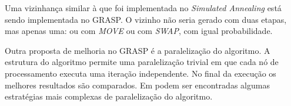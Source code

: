 \documentclass[11pt]{article}
\begin{document}
Uma vizinhança similar à que foi implementada no \textit{Simulated Annealing} está sendo implementada no GRASP. O vizinho não seria gerado com duas etapas, mas apenas uma: ou com \textit{MOVE} ou com \textit{SWAP}, com igual probabilidade.

Outra proposta de melhoria no GRASP é a paralelização do algoritmo. A estrutura do algoritmo permite uma paralelização trivial em que cada nó de processamento executa uma iteração independente. No final da execução os melhores resultados são comparados. Em \cite{grasp_paralelo} podem ser encontradas algumas estratégias mais complexas de paralelização do algoritmo.





\end{document}
